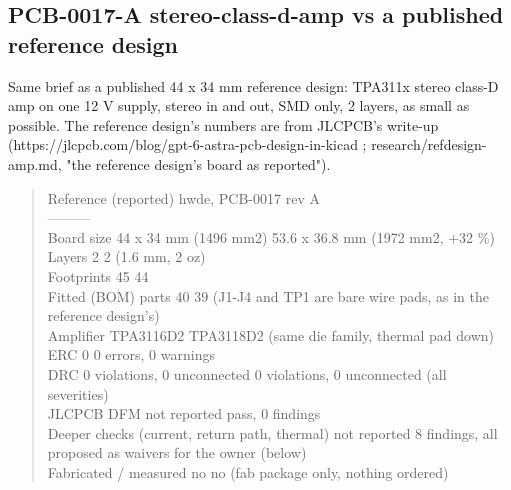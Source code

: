 \documentclass[11pt]{article}
\begin{document}
\subsection*{PCB-0017-A stereo-class-d-amp vs a published reference design}
Same brief as a published 44 x 34 mm reference design: TPA311x stereo class-D amp on one 12 V supply, stereo in and out, SMD only, 2 layers, as small as possible. The reference design's numbers are from JLCPCB's write-up (https://jlcpcb.com/blog/gpt-6-astra-pcb-design-in-kicad ; research/refdesign-amp.md, "the reference design's board as reported").

\begin{quote}\small\ttfamily\raggedright
\textbar{} \textbar{} Reference (reported) \textbar{} hwde, PCB-0017 rev A \textbar{}\\
\textbar{}---\textbar{}---\textbar{}---\textbar{}\\
\textbar{} Board size \textbar{} 44 x 34 mm (1496 mm2) \textbar{} 53.6 x 36.8 mm (1972 mm2, +32 \%) \textbar{}\\
\textbar{} Layers \textbar{} 2 \textbar{} 2 (1.6 mm, 2 oz) \textbar{}\\
\textbar{} Footprints \textbar{} 45 \textbar{} 44 \textbar{}\\
\textbar{} Fitted (BOM) parts \textbar{} 40 \textbar{} 39 (J1-J4 and TP1 are bare wire pads, as in the reference design's) \textbar{}\\
\textbar{} Amplifier \textbar{} TPA3116D2 \textbar{} TPA3118D2 (same die family, thermal pad down) \textbar{}\\
\textbar{} ERC \textbar{} 0 \textbar{} 0 errors, 0 warnings \textbar{}\\
\textbar{} DRC \textbar{} 0 violations, 0 unconnected \textbar{} 0 violations, 0 unconnected (all severities) \textbar{}\\
\textbar{} JLCPCB DFM \textbar{} not reported \textbar{} pass, 0 findings \textbar{}\\
\textbar{} Deeper checks (current, return path, thermal) \textbar{} not reported \textbar{} 8 findings, all proposed as waivers for the owner (below) \textbar{}\\
\textbar{} Fabricated / measured \textbar{} no \textbar{} no (fab package only, nothing ordered) \textbar{}
\end{quote}
\end{document}
